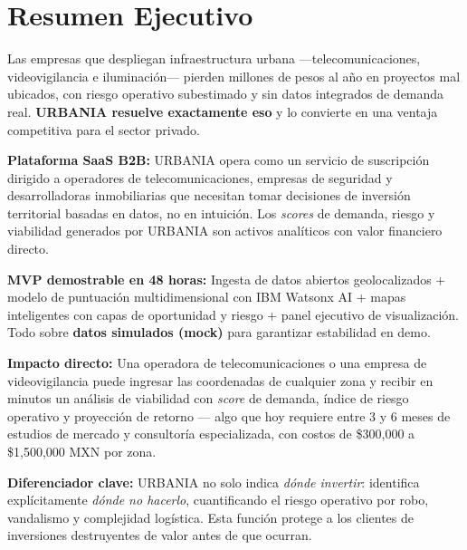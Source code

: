 \documentclass[12pt,a4paper]{article}
\begin{document}
\tableofcontents
\newpage

\section{Resumen Ejecutivo}

\begin{tcolorbox}[cajaprincipal]
Las empresas que despliegan infraestructura urbana —telecomunicaciones, videovigilancia e iluminación— pierden millones de pesos al año en proyectos mal ubicados, con riesgo operativo subestimado y sin datos integrados de demanda real. \textbf{URBANIA resuelve exactamente eso} y lo convierte en una ventaja competitiva para el sector privado.

\medskip
\textbf{Plataforma SaaS B2B:} URBANIA opera como un servicio de suscripción dirigido a operadores de telecomunicaciones, empresas de seguridad y desarrolladoras inmobiliarias que necesitan tomar decisiones de inversión territorial basadas en datos, no en intuición. Los \textit{scores} de demanda, riesgo y viabilidad generados por URBANIA son activos analíticos con valor financiero directo.

\medskip
\textbf{MVP demostrable en 48 horas:} Ingesta de datos abiertos geolocalizados + modelo de puntuación multidimensional con IBM Watsonx AI + mapas inteligentes con capas de oportunidad y riesgo + panel ejecutivo de visualización. Todo sobre \textbf{datos simulados (mock)} para garantizar estabilidad en demo.

\medskip
\textbf{Impacto directo:} Una operadora de telecomunicaciones o una empresa de videovigilancia puede ingresar las coordenadas de cualquier zona y recibir en minutos un análisis de viabilidad con \textit{score} de demanda, índice de riesgo operativo y proyección de retorno — algo que hoy requiere entre 3 y 6 meses de estudios de mercado y consultoría especializada, con costos de \$300{,}000 a \$1{,}500{,}000 MXN por zona.

\medskip
\textbf{Diferenciador clave:} URBANIA no solo indica \textit{dónde invertir}: identifica explícitamente \textit{dónde no hacerlo}, cuantificando el riesgo operativo por robo, vandalismo y complejidad logística. Esta función protege a los clientes de inversiones destruyentes de valor antes de que ocurran.
\end{tcolorbox}

\end{document}
